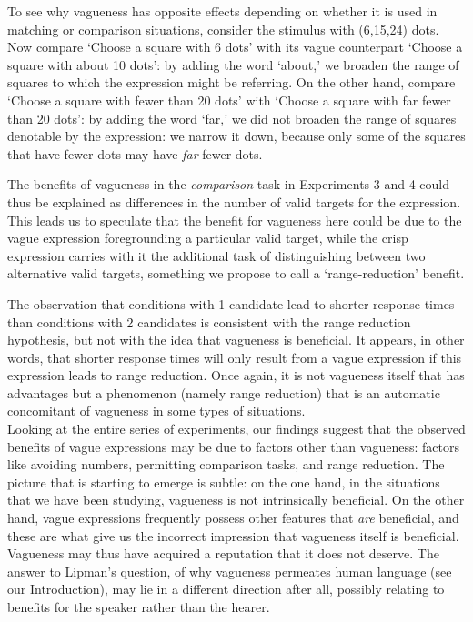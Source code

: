 \documentclass[ %
  graybox       %
 ,envcountchap  %
 ,sectrefs      %
]{svmono}
\begin{document}
To see why vagueness has opposite effects depending on whether it is used in matching or comparison situations, consider the stimulus with (6,15,24) dots. Now compare `Choose a square with 6 dots' with its vague counterpart `Choose a square with about 10 dots': by adding the word `about,' we broaden the range of squares to which the expression might be referring. On the other hand, compare `Choose a square with fewer than 20 dots' with `Choose a square with far fewer than 20 dots': by adding the word `far,' we did not broaden the range of squares denotable by the expression: we narrow it down, because only some of the squares that have fewer dots may have {\em far} fewer dots.

The benefits of vagueness in the \emph{comparison} task in Experiments 3 and 4 could thus be explained as differences in the number of valid targets for the expression. This leads us to speculate that the benefit for vagueness here could be due to the vague expression foregrounding a particular valid target, while the crisp expression carries with it the additional task of distinguishing between two alternative valid targets, something we propose to call a `range-reduction' benefit.

The observation that conditions with 1 candidate lead to shorter response times than conditions with 2 candidates is consistent with the range reduction hypothesis, but not with the idea that vagueness is beneficial. It appears, in other words, that shorter response times will only result from a vague expression if this expression leads to range reduction. Once again, it is not vagueness itself that has advantages but a phenomenon (namely range reduction) that is an automatic concomitant of vagueness in some types of situations.\\[2ex]
%
Looking at the entire series of experiments, our findings suggest that the observed benefits of vague expressions may be due to factors other than vagueness: factors like avoiding numbers, permitting comparison tasks, and range reduction. The picture that is starting to emerge is subtle: on the one hand, in the situations that we have been studying, vagueness is not intrinsically beneficial. On the other hand, vague expressions frequently possess other features that \emph{are} beneficial, and these are what give us the incorrect impression that vagueness itself is beneficial. Vagueness may thus have acquired a reputation that it does not deserve. The answer to Lipman's question, of why vagueness permeates human language (see our Introduction), may lie in a different direction after all, possibly relating to benefits for the speaker rather than the hearer.
\end{document}
